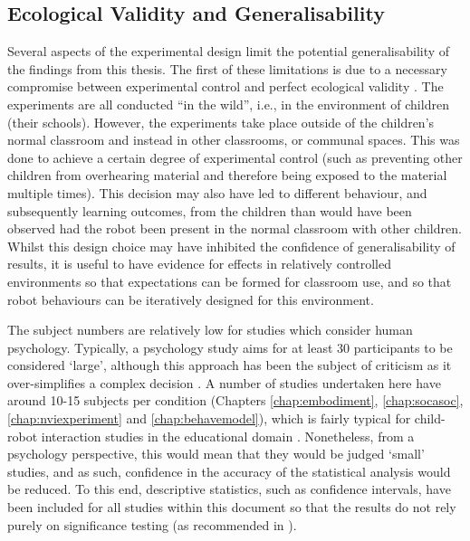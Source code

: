 \subsection{Ecological Validity and Generalisability} \label{sec:disc-experiments}
Several aspects of the experimental design limit the potential generalisability of the findings from this thesis. The first of these limitations is due to a necessary compromise between experimental control and perfect ecological validity \citep{ros2011child}. The experiments are all conducted ``in the wild'', i.e., in the environment of children (their schools). However, the experiments take place outside of the children's normal classroom and instead in other classrooms, or communal spaces. This was done to achieve a certain degree of experimental control (such as preventing other children from overhearing material and therefore being exposed to the material multiple times). This decision may also have led to different behaviour, and subsequently \gls{learning} outcomes, from the children than would have been observed had the robot been present in the normal classroom with other children. Whilst this design choice may have inhibited the confidence of generalisability of results, it is useful to have evidence for effects in relatively controlled environments so that expectations can be formed for classroom use, and so that robot behaviours can be iteratively designed for this environment.

The subject numbers are relatively low for studies which consider human psychology. Typically, a psychology study aims for at least 30 participants to be considered `large', although this approach has been the subject of criticism as it over-simplifies a complex decision \citep{kar201330}. A number of studies undertaken here have around 10-15 subjects per condition (Chapters \ref{chap:embodiment}, \ref{chap:socasoc}, \ref{chap:nviexperiment} and \ref{chap:behavemodel}), which is fairly typical for child-robot interaction studies in the educational domain  \citep{leite2014empathic,saerbeck2010expressive,zaga2015effect}. Nonetheless, from a psychology perspective, this would mean that they would be judged `small' studies, and as such, confidence in the accuracy of the statistical analysis would be reduced. To this end, descriptive statistics, such as confidence intervals, have been included for all studies within this document so that the results do not rely purely on significance testing (as recommended in \citealp{baxter2016althri}).

